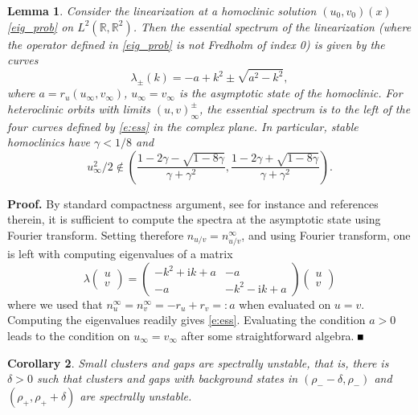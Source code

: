 \documentclass[10pt]{article}
\newtheorem{Lemma}{Lemma}[section]
\newtheorem{Corollary}[Lemma]{Corollary}
\newenvironment{Proof}%
 {\begin{trivlist} \item[]{\bf Proof. }}%
 {\hspace*{\fill}$\rule{.4\baselineskip}{.4\baselineskip}$\end{trivlist}}
\newcommand{\R}{\mathbb{R}}
\newcommand{\rmi}{\mathrm{i}}
\begin{document}
\begin{Lemma}\label{l:ess}
 Consider the linearization at a homoclinic solution $(u_0,v_0)(x)$ \eqref{eig_prob} on $L^2(\R,\R^2)$. Then the essential spectrum of the linearization (where the operator defined in \eqref{eig_prob} is not Fredholm of index 0) is given by the curves
 \begin{equation}\label{e:ess}
  \lambda_\pm(k)=-a+k^2 \pm \sqrt{a^2-k^2},
 \end{equation}
where $a=r_u(u_\infty,v_\infty)$, $u_\infty=v_\infty$ is the asymptotic state of the homoclinic. For heteroclinic orbits with limits $(u,v)_\infty^\pm$, the essential spectrum is to the left  of the four curves defined by \eqref{e:ess} in the complex plane. In particular, stable homoclinics have $\gamma<1/8$ and 
\begin{equation}\label{e:in}
 u_\infty^2/2\not\in \left( \frac{1 -2\gamma -\sqrt{1-8\gamma}}{\gamma+\gamma^2}, \frac{1 -2\gamma +\sqrt{1-8\gamma}}{\gamma+\gamma^2}\right). 
\end{equation}
\end{Lemma}
\begin{Proof}
 By standard compactness argument, see for instance \cite{fs} and references therein, it is sufficient to compute the spectra at the asymptotic state using Fourier transform. Setting therefore $n_{u/v}=n_{u/v}^\infty$, and using Fourier transform, one is left with computing eigenvalues of a matrix
 \begin{equation}\label{e:mat}
  \lambda\left(\begin{array}{c}u\\v\end{array}\right)=\left(\begin{array}{cc} -k^2+\rmi k  +a &-a \\ -a& -k^2-\rmi k +a \end{array}\right)\left(\begin{array}{c}u\\v\end{array}\right)
 \end{equation}
where we used that $n_u^\infty=n_v^\infty=-r_u+r_v=:a$ when evaluated on  $u=v$. Computing the eigenvalues readily gives \eqref{e:ess}. Evaluating the condition $a>0$ leads to the condition on $u_\infty=v_\infty$ after some straightforward algebra.
 \end{Proof}
\begin{Corollary}\label{c:inst}
 Small clusters and gaps are spectrally unstable, that is, there is $\delta>0$ such that clusters and gaps with background states in $(\rho_--\delta,\rho_-)$ and $(\rho_+,\rho_++\delta)$ are spectrally unstable. 
\end{Corollary}
\end{document}
